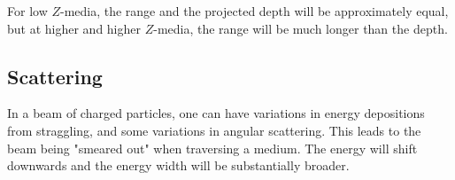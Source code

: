 For low $Z$-media, the range and the projected depth will be approximately equal, but at higher and higher $Z$-media, the range will be much longer than the depth.

\subsection{Scattering}

In a beam of charged particles, one can have variations in energy depositions from straggling, and some variations in angular scattering. 
This leads to the beam being "smeared out" when traversing a medium.
The energy will shift downwards and the energy width will be substantially broader.
